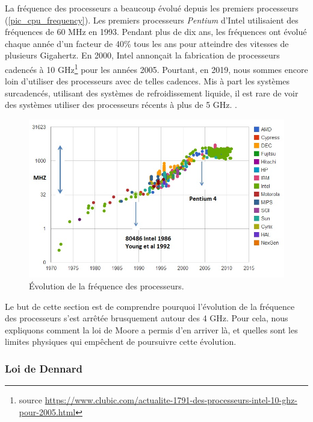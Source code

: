        La fréquence des processeurs a beaucoup évolué depuis les premiers processeurs (\autoref{pic_cpu_frequency}). Les premiers processeurs \textit{Pentium} d'Intel utilisaient des fréquences de 60 MHz en 1993. Pendant plus de dix ans, les fréquences ont évolué chaque année d'un facteur de 40\%  tous les ans pour atteindre des vitesses de plusieurs Gigahertz. En 2000, Intel annonçait la fabrication de processeurs cadencés à 10 GHz\footnote{source \url{https://www.clubic.com/actualite-1791-des-processeurs-intel-10-ghz-pour-2005.html}} pour les années 2005. Pourtant, en 2019, nous sommes encore loin d'utiliser des processeurs avec de telles cadences. Mis à part les systèmes surcadencés, utilisant des systèmes de refroidissement liquide, il est rare de voir des systèmes utiliser des processeurs récents à plus de 5 GHz.
        .
        \begin{figure}
            \center
            \includegraphics[width=14cm]{images/cpu_frequency.jpg}
            \caption{\label{pic_cpu_frequency} Évolution de la fréquence des processeurs\protect\footnotemark.}
        \end{figure}
        
        Le but de cette section est de comprendre pourquoi l'évolution de la fréquence des processeurs s'est arrêtée brusquement autour des 4 GHz. Pour cela, nous expliquons comment la loi de Moore a permis d'en arriver là, et quelles sont les limites physiques qui empêchent de poursuivre cette évolution.


    \subsubsection{Loi de Dennard}\label{sec:denard}

